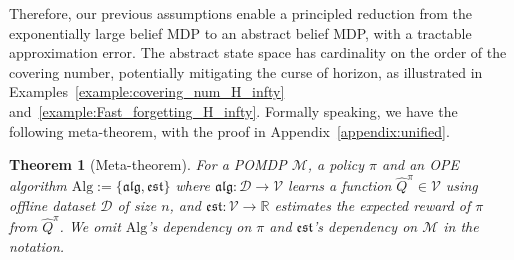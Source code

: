\documentclass[twoside]{article}
\newtheorem{theorem}{Theorem}
\newcommand{\CAL}[1]{\mathcal{#1}}
\begin{document}
Therefore, our previous assumptions enable a principled reduction from the exponentially large belief MDP to an abstract belief MDP, with a tractable approximation error. The abstract state space has cardinality on the order of the covering number, potentially mitigating the curse of horizon, as illustrated in Examples~\ref{example:covering_num_H_infty} and~\ref{example:Fast_forgetting_H_infty}. Formally speaking, we have the following meta-theorem, with the proof in Appendix~\ref{appendix:unified}.

\begin{theorem}[Meta-theorem]\label{Thm:meta}
For a POMDP $\CAL{M}$, a policy $\pi$ and an OPE algorithm $\mathrm{Alg}:=\{\mathfrak{alg},\mathfrak{est}\}$ where $\mathfrak{alg}:\CAL{D}\to\CAL{V}$ learns a function $\hat{Q}^\pi\in \CAL{V}$ using offline dataset $\CAL{D}$ of size $n$, and $\mathfrak{est}:\CAL{V}\to\mathbb{R}$ estimates the expected reward of $\pi$ from $\hat{Q}^\pi$. We omit $\mathrm{Alg}$'s dependency on $\pi$ and $\mathfrak{est}$'s dependency on $\CAL{M}$ in the notation.


\end{theorem}
\end{document}
